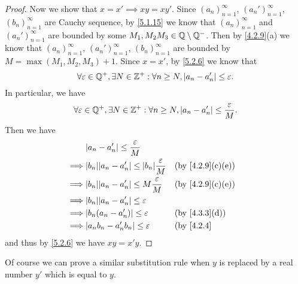 \begin{proof}
  Now we show that \(x = x' \implies xy = xy'\).
  Since \((a_n)_{n = 1}^\infty\), \((a_n')_{n = 1}^\infty\), \((b_n)_{n = 1}^\infty\) are Cauchy sequence, by \cref{5.1.15} we know that \((a_n)_{n = 1}^\infty\) and \((a_n')_{n = 1}^\infty\) are bounded by some \(M_1, M_2 M_3 \in \mathbb{Q} \setminus \mathbb{Q}^-\).
  Then by \cref{4.2.9}(a) we know that \((a_n)_{n = 1}^\infty\), \((a_n')_{n = 1}^\infty\), \((b_n)_{n = 1}^\infty\) are bounded by \(M = \max(M_1, M_2, M_3) + 1\).
  Since \(x = x'\), by \cref{5.2.6} we know that
  \[
    \forall \varepsilon \in \mathbb{Q}^+, \exists N \in \mathbb{Z}^+ : \forall n \geq N, \left\lvert a_n - a_n'\right\rvert \leq \varepsilon.
  \]
  In particular, we have
  \[
    \forall \varepsilon \in \mathbb{Q}^+, \exists N \in \mathbb{Z}^+ : \forall n \geq N, \left\lvert a_n - a_n'\right\rvert \leq \dfrac{\varepsilon}{M}.
  \]
  Then we have
  \begin{align*}
             & \abs{a_n - a_n'} \leq \dfrac{\varepsilon}{M}                                                         \\
    \implies & \abs{b_n} \abs{a_n - a_n'} \leq \abs{b_n} \dfrac{\varepsilon}{M} &  & \text{(by \cref{4.2.9}(c)(e))} \\
    \implies & \abs{b_n} \abs{a_n - a_n'} \leq M \dfrac{\varepsilon}{M}         &  & \text{(by \cref{4.2.9}(c)(e))} \\
    \implies & \abs{b_n} \abs{a_n - a_n'} \leq \varepsilon                                                          \\
    \implies & \abs{b_n (a_n - a_n')} \leq \varepsilon                          &  & \text{(by \cref{4.3.3}(d))}    \\
    \implies & \abs{a_n b_n - a_n' b_n} \leq \varepsilon                        &  & \text{(by \cref{4.2.4}}
  \end{align*}
  and thus by \cref{5.2.6} we have \(xy = x'y\).
\end{proof}

\begin{note}
  Of course we can prove a similar substitution rule when \(y\) is replaced by a real number \(y'\) which is equal to \(y\).
\end{note}

